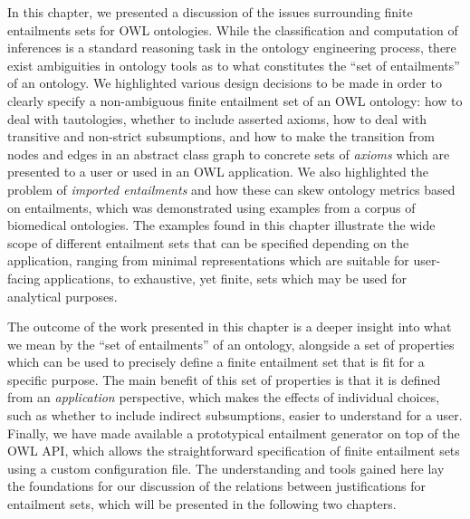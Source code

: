 In this chapter, we presented a discussion of the issues surrounding finite entailments sets for OWL ontologies. While the classification and computation of inferences is a standard reasoning task in the ontology engineering process, there exist ambiguities in ontology tools as to what constitutes the \enquote{set of entailments} of an ontology. We highlighted various design decisions to be made in order to clearly specify a non-ambiguous finite entailment set of an OWL ontology: how to deal with tautologies, whether to include asserted axioms, how to deal with transitive and non-strict subsumptions, and how to make the transition from nodes and edges in an abstract class graph to concrete sets of \emph{axioms} which are presented to a user or used in an OWL application. We also highlighted the problem of \emph{imported entailments} and how these can skew ontology metrics based on entailments, which was demonstrated using examples from a corpus of biomedical ontologies. The examples found in this chapter illustrate the wide scope of different entailment sets that can be specified depending on the application, ranging from minimal representations which are  suitable for user-facing applications, to exhaustive, yet finite, sets which may be used for analytical purposes.

The outcome of the work presented in this chapter is a deeper insight into what we mean by the \enquote{set of entailments} of an ontology, alongside a set of properties which can be used to precisely define a finite entailment set that is fit for a specific purpose. The main benefit of this set of properties is that it is defined from an \emph{application} perspective, which makes the effects of individual choices, such as whether to include indirect subsumptions, easier to understand for a user. Finally, we have made available a prototypical entailment generator on top of the OWL API, which allows the straightforward specification of finite entailment sets using a custom configuration file. The understanding and tools gained here lay the foundations for our discussion of the relations between justifications for entailment sets, which will be presented in the following two chapters.

